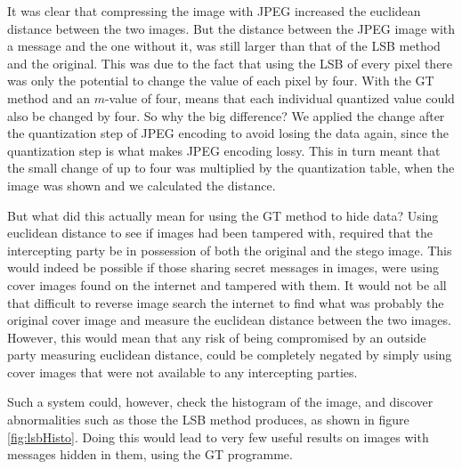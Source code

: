 It was clear that compressing the image with JPEG increased the euclidean distance between the two images.
But the distance between the JPEG image with a message and the one without it, was still larger than that of the LSB method and the original.
This was due to the fact that using the LSB of every pixel there was only the potential to change the value of each pixel by four.
With the GT method and an $m$-value of four, means that each individual quantized value could also be changed by four. 
So why the big difference? 
We applied the change after the quantization step of JPEG encoding to avoid losing the data again, since the quantization step is what makes JPEG encoding lossy.
This in turn meant that the small change of up to four was multiplied by the quantization table, when the image was shown and we calculated the distance.

But what did this actually mean for using the GT method to hide data?
Using euclidean distance to see if images had been tampered with, required that the intercepting party be in possession of both the original and the stego image.
This would indeed be possible if those sharing secret messages in images, were using cover images found on the internet and tampered with them.
It would not be all that difficult to reverse image search the internet to find what was probably the original cover image and measure the euclidean distance between the two images.
However, this would mean that any risk of being compromised by an outside party measuring euclidean distance, could be completely negated by simply using cover images that were not available to any intercepting parties.


Such a system could, however, check the histogram of the image, and discover abnormalities such as those the LSB method produces, as shown in figure \ref{fig:lsbHisto}.
Doing this would lead to very few useful results on images with messages hidden in them, using the GT programme.